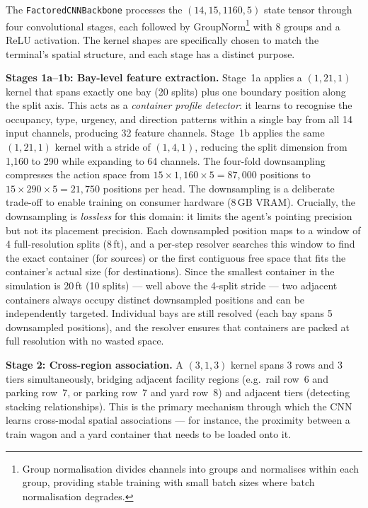 The \texttt{FactoredCNNBackbone} processes the $(14, 15, 1160, 5)$ state tensor through four convolutional stages, each followed by GroupNorm\footnote{Group normalisation divides channels into groups and normalises within each group, providing stable training with small batch sizes where batch normalisation degrades.} \cite{wu2020groupnorm} with 8 groups and a ReLU activation. The kernel shapes are specifically chosen to match the terminal's spatial structure, and each stage has a distinct purpose.

\textbf{Stages 1a--1b: Bay-level feature extraction.} Stage~1a applies a $(1, 21, 1)$ kernel that spans exactly one bay (20 splits) plus one boundary position along the split axis. This acts as a \emph{container profile detector}: it learns to recognise the occupancy, type, urgency, and direction patterns within a single bay from all 14 input channels, producing 32 feature channels. Stage~1b applies the same $(1, 21, 1)$ kernel with a stride of $(1, 4, 1)$, reducing the split dimension from 1{,}160 to 290 while expanding to 64 channels. The four-fold downsampling compresses the action space from $15 \times 1{,}160 \times 5 = 87{,}000$ positions to $15 \times 290 \times 5 = 21{,}750$ positions per head. The downsampling is a deliberate trade-off to enable training on consumer hardware (8\,GB VRAM). Crucially, the downsampling is \emph{lossless} for this domain: it limits the agent's pointing precision but not its placement precision. Each downsampled position maps to a window of 4 full-resolution splits (8\,ft), and a per-step resolver searches this window to find the exact container (for sources) or the first contiguous free space that fits the container's actual size (for destinations). Since the smallest container in the simulation is 20\,ft (10 splits) --- well above the 4-split stride --- two adjacent containers always occupy distinct downsampled positions and can be independently targeted. Individual bays are still resolved (each bay spans 5 downsampled positions), and the resolver ensures that containers are packed at full resolution with no wasted space.

\textbf{Stage 2: Cross-region association.} A $(3, 1, 3)$ kernel spans 3 rows and 3 tiers simultaneously, bridging adjacent facility regions (e.g.\ rail row~6 and parking row~7, or parking row~7 and yard row~8) and adjacent tiers (detecting stacking relationships). This is the primary mechanism through which the CNN learns cross-modal spatial associations --- for instance, the proximity between a train wagon and a yard container that needs to be loaded onto it.

